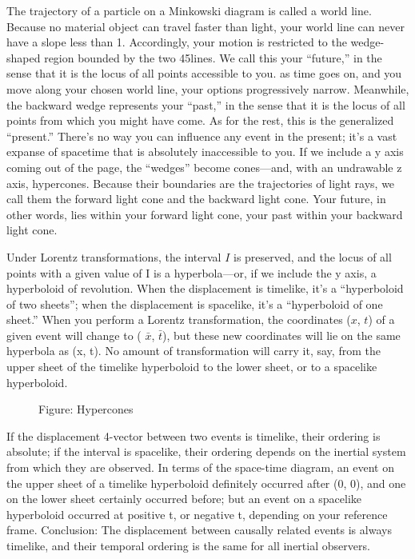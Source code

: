 \documentclass[../../main.tex]{subfiles}
\begin{document}
The trajectory of a particle on a Minkowski diagram is called a world line. Because no material object can travel faster than light, your world line can never have a slope less than 1. Accordingly, your motion is restricted to the wedge-shaped region bounded by the two 45\textdegree lines. We call this your “future,” in the sense that it is the locus of all points accessible to you. as time goes on, and you move along your chosen world line, your options progressively narrow. Meanwhile, the backward wedge represents your “past,” in the sense that it is the locus of all points from which you might have come. As for the rest, this is the generalized “present.” There's no way you can influence any event in the present; it's a vast expanse of spacetime that is absolutely inaccessible to you. If we include a y axis coming out of the page, the “wedges” become cones—and, with an undrawable z axis, hypercones. Because their boundaries are the trajectories of light rays, we call them the forward light cone and the backward light cone. Your future, in other words, lies within your forward light cone, your past within your backward light cone.

Under Lorentz transformations, the interval $I$ is preserved, and the locus of all points with a given value of I is a hyperbola—or, if we include the y axis, a hyperboloid of revolution. When the displacement is timelike, it's a “hyperboloid of two sheets”; when the displacement is spacelike, it's a “hyperboloid of one sheet.” When you perform a Lorentz transformation, the coordinates ($x$, $t$) of a given event will change to ( $\bar{x}$, $\bar{t}$), but these new coordinates will lie on the same hyperbola as (x, t). No amount of transformation will carry it, say, from the upper sheet of the timelike hyperboloid to the lower sheet, or to a spacelike hyperboloid.
\begin{figure}
    \centering
    \caption*{Figure: Hypercones}
\end{figure}

If the displacement 4-vector between two events is timelike, their ordering is absolute; if the interval is spacelike, their ordering depends on the inertial system from which they are observed. In terms of the space-time diagram, an event on the upper sheet of a timelike hyperboloid definitely occurred after (0, 0), and one on the lower sheet certainly occurred before; but an event on a spacelike hyperboloid occurred at positive t, or negative t, depending on your reference frame. Conclusion: The displacement between causally related events is always timelike, and their temporal ordering is the same for all inertial observers.
\end{document}
